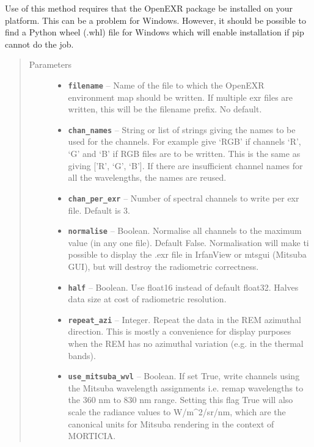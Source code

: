 \documentclass[a4paper,10pt,english]{sphinxmanual}
\begin{document}
\begin{fulllineitems}
\begin{fulllineitems}
Use of this method requires that the OpenEXR package be installed on your platform. This can be a problem
for Windows. However, it should be possible to find a Python wheel (.whl) file for Windows which will
enable installation if pip cannot do the job.
\begin{quote}\begin{description}
\item[{Parameters}] \leavevmode\begin{itemize}
\item {} 
\textbf{\texttt{filename}} -- Name of the file to which the OpenEXR environment map should be written. If multiple exr
files are written, this will be the filename prefix. No default.

\item {} 
\textbf{\texttt{chan\_names}} -- String or list of strings giving the names to be used for the channels. For example
give `RGB' if channels `R', `G' and `B' if RGB files are to be written. This is the same as giving
{[}'R', `G', `B'{]}. If there are insufficient channel names for all the wavelengths, the names are
reused.

\item {} 
\textbf{\texttt{chan\_per\_exr}} -- Number of spectral channels to write per exr file. Default is 3.

\item {} 
\textbf{\texttt{normalise}} -- Boolean. Normalise all channels to the maximum value (in any one file). Default False.
Normalisation will make ti possible to display the .exr file in IrfanView or mtsgui (Mitsuba GUI), but
will destroy the radiometric correctness.

\item {} 
\textbf{\texttt{half}} -- Boolean. Use float16 instead of default float32. Halves data size at cost of radiometric
resolution.

\item {} 
\textbf{\texttt{repeat\_azi}} -- Integer. Repeat the data in the REM azimuthal direction. This is mostly a convenience for
display purposes when the REM has no azimuthal variation (e.g. in the thermal bands).

\item {} 
\textbf{\texttt{use\_mitsuba\_wvl}} -- Boolean. If set True, write channels using the Mitsuba wavelength assignments i.e.
remap wavelengths to the 360 nm to 830 nm range. Setting this flag True will also scale the radiance
values to W/m\textasciicircum{}2/sr/nm, which are the canonical units for Mitsuba rendering in the context of MORTICIA.


\end{itemize}
\end{description}
\end{quote}
\end{fulllineitems}
\end{fulllineitems}
\end{document}
